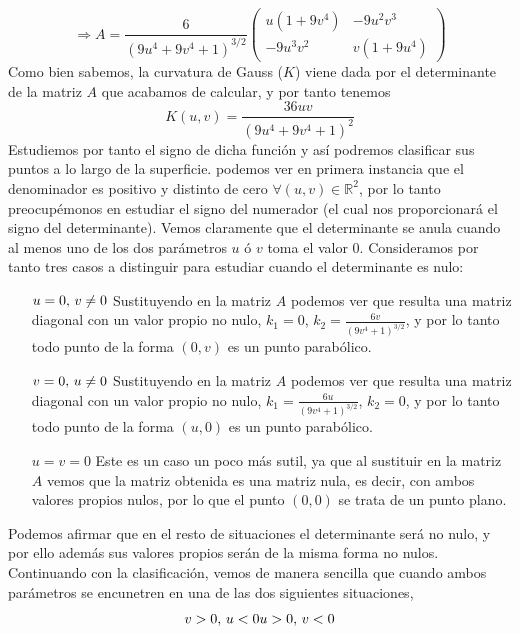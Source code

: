 \documentclass[fleqn]{article}
\def\R{\mathds{R}}
\begin{document}
    $$
    \Rightarrow A = \frac{6}{(9u^4 + 9v^4 + 1)^{3/2}}
    \begin{pmatrix}
        u(1+9v^4) & -9u^2v^3 \\
        -9u^3v^2 & v(1+9u^4)
    \end{pmatrix}
    $$
    Como bien sabemos, la curvatura de Gauss ($K$) viene dada por el determinante de la matriz $A$ que acabamos de calcular, y por tanto tenemos
    $$K(u,v) = \frac{36uv}{(9u^4 + 9v^4 + 1)^{2}}$$
    Estudiemos por tanto el signo de dicha función y así podremos clasificar sus puntos a lo largo de la superficie. podemos ver en primera instancia que el denominador
    es positivo y distinto de cero $\forall (u,v) \in \R^2$, por lo tanto preocupémonos en estudiar el signo del numerador (el cual nos proporcionará el signo del determinante). 
    Vemos claramente que el determinante se anula cuando al menos uno de los dos parámetros $u$ ó $v$ toma el valor $0$. Consideramos por tanto tres casos a 
    distinguir para estudiar cuando el determinante es nulo:
    \begin{enumerate}
        \item[$u=0, \thinspace v\neq 0$] Sustituyendo en la matriz $A$ podemos ver que resulta una matriz diagonal con un valor propio no nulo, 
                $k_1 = 0$, $k_2 = \frac{6v}{(9v^4 + 1)^{3/2}}$, y por lo tanto todo punto de la forma $(0,v)$ es un punto parabólico.
        \item[$v=0, \thinspace u\neq 0$] Sustituyendo en la matriz $A$ podemos ver que resulta una matriz diagonal con un valor propio no nulo, 
                $k_1 = \frac{6u}{(9v^4 + 1)^{3/2}}$, $k_2 = 0$, y por lo tanto todo punto de la forma $(u,0)$ es un punto parabólico.
        \item[$u = v = 0$] Este es un caso un poco más sutil, ya que al sustituir en la matriz $A$ vemos que la matriz obtenida es una matriz nula, es decir,
                con ambos valores propios nulos, por lo que el punto $(0,0)$ se trata de un punto plano. 
    \end{enumerate}
    Podemos afirmar que en el resto de situaciones el determinante será no nulo, y por ello además sus valores propios serán de la misma forma no nulos.
    Continuando con la clasificación, vemos de manera sencilla que cuando ambos parámetros se encunetren en una de las dos siguientes situaciones, 
    \begin{equation*}
        v>0, \thinspace u<0 \\
        u>0, \thinspace v<0
    \end{equation*}
\end{document}
